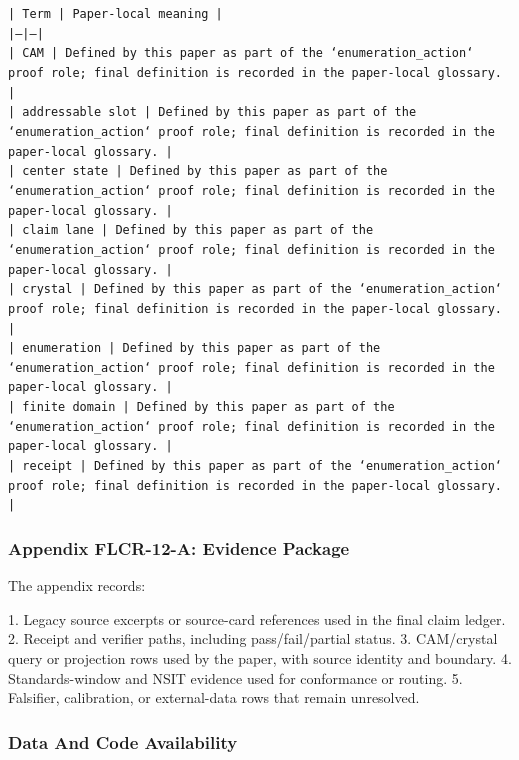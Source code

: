 \documentclass[11pt]{article}
\begin{document}
\noindent\texttt{| Term | Paper-local meaning |}\\
\noindent\texttt{|---|---|}\\
\noindent\texttt{| CAM | Defined by this paper as part of the `enumeration\_action` proof role; final definition is recorded in the paper-local glossary. |}\\
\noindent\texttt{| addressable slot | Defined by this paper as part of the `enumeration\_action` proof role; final definition is recorded in the paper-local glossary. |}\\
\noindent\texttt{| center state | Defined by this paper as part of the `enumeration\_action` proof role; final definition is recorded in the paper-local glossary. |}\\
\noindent\texttt{| claim lane | Defined by this paper as part of the `enumeration\_action` proof role; final definition is recorded in the paper-local glossary. |}\\
\noindent\texttt{| crystal | Defined by this paper as part of the `enumeration\_action` proof role; final definition is recorded in the paper-local glossary. |}\\
\noindent\texttt{| enumeration | Defined by this paper as part of the `enumeration\_action` proof role; final definition is recorded in the paper-local glossary. |}\\
\noindent\texttt{| finite domain | Defined by this paper as part of the `enumeration\_action` proof role; final definition is recorded in the paper-local glossary. |}\\
\noindent\texttt{| receipt | Defined by this paper as part of the `enumeration\_action` proof role; final definition is recorded in the paper-local glossary. |}\\

\subsubsection*{Appendix FLCR-12-A: Evidence Package}

The appendix records:

1. Legacy source excerpts or source-card references used in the final claim ledger.
2. Receipt and verifier paths, including pass/fail/partial status.
3. CAM/crystal query or projection rows used by the paper, with source identity and boundary.
4. Standards-window and NSIT evidence used for conformance or routing.
5. Falsifier, calibration, or external-data rows that remain unresolved.

\subsubsection*{Data And Code Availability}
\end{document}

